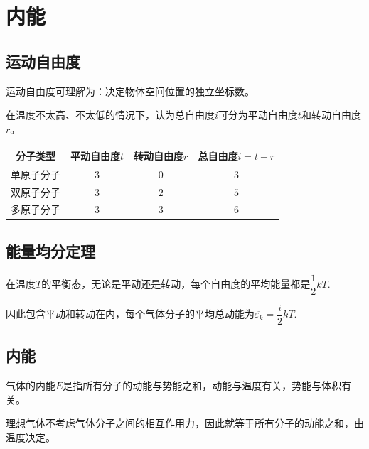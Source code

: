 \section{内能}

\subsection{运动自由度}

运动自由度可理解为：决定物体空间位置的独立坐标数。

在温度不太高、不太低的情况下，认为总自由度$i$可分为平动自由度$t$和转动自由度$r$。

\begin{table}[htb]
    \centering
    \begin{tabular}{|c|c|c|c|}
        \hline
        分子类型 & 平动自由度$t$ & 转动自由度$r$ & 总自由度$i=t+r$ \\
        \hline
        单原子分子 & $3$ & $0$ & $3$ \\
        \hline
        双原子分子 & $3$ & $2$ & $5$ \\
        \hline
        多原子分子 & $3$ & $3$ & $6$ \\
        \hline
    \end{tabular}
\end{table}


\subsection{能量均分定理}

在温度$T$的平衡态，无论是平动还是转动，每个自由度的平均能量都是$\dfrac{1}{2}kT$.

因此包含平动和转动在内，每个气体分子的平均总动能为$\overline{\varepsilon_k}=\dfrac{i}{2}kT$.

\subsection{内能}

气体的内能$E$是指所有分子的动能与势能之和，动能与温度有关，势能与体积有关。

理想气体不考虑气体分子之间的相互作用力，因此就等于所有分子的动能之和，由温度决定。


